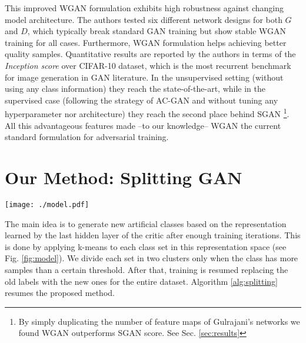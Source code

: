 \documentclass[times,twocolumn]{article}
\begin{document}
This improved WGAN formulation exhibits high robustness against changing model architecture. The authors tested six different network designs for both $G$ and $D$, which typically break standard GAN training but show stable WGAN training for all cases. Furthermore, WGAN formulation helps achieving better quality samples. Quantitative results are reported by the authors in terms of the \textit{Inception score} \cite{Salimans2016} over CIFAR-10 dataset, which is the most recurrent benchmark for image generation in GAN literature. In the unsupervised setting (without using any class information) they reach the state-of-the-art, while in the supervised case (following the strategy of AC-GAN and without tuning any hyperparameter nor architecture) they reach the second place behind SGAN \cite{Huang2016}\footnote{By simply duplicating the number of feature maps of Gulrajani's networks we found WGAN outperforms SGAN score. See Sec. \ref{sec:results}}. All this advantageous features made --to our knowledge-- WGAN the current standard formulation for adversarial training.

\section{Our Method: Splitting GAN}
\begin{figure*}[h]
 \centering
 \texttt{[image: ./model.pdf]}
\caption{Our Class Splitting GAN proposal is based on generating new classes by clustering in the representation space learned by the critic. This new classes are used in the standard supervised setup of WGAN.}
 \label{fig:model}
\end{figure*}

The main idea is to generate new artificial classes based on the representation learned by the last hidden layer of the critic after enough training iterations. This is done by applying k-means to each class set in this representation space (see Fig. \ref{fig:model}). We divide each set in two clusters only when the class has more samples than a certain threshold. After that, training is resumed replacing the old labels with the new ones for the entire dataset. Algorithm \ref{alg:splitting} resumes the proposed method.
\end{document}
